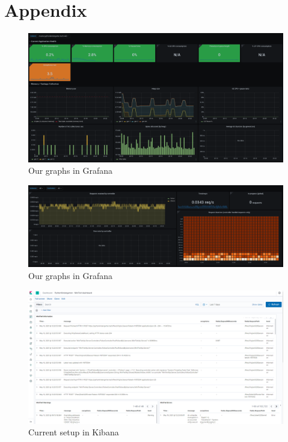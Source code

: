 \documentclass{article}
\begin{document}
\section{Appendix}
\begin{figure}[h!]
    \centering
    \includegraphics[scale=0.2]{images/grafana_1.png}
    \caption{ Our graphs in Grafana }
\end{figure}

\begin{figure}[h!]
    \centering
    \includegraphics[scale=0.2]{images/grafana_2.png}
    \caption{ Our graphs in Grafana }
\end{figure}

\begin{figure}[h!]
    \centering
    \includegraphics[scale=0.2]{images/kibana_1.png}
    \caption{ Current setup in Kibana }
\end{figure}
\end{document}
